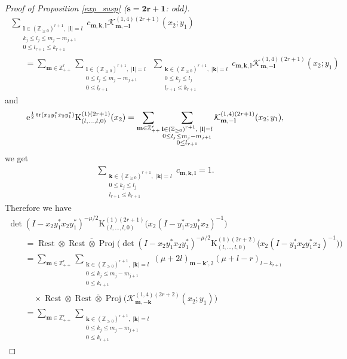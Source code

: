 \documentclass[pdftex]{sigma}
\numberwithin{equation}{section}
\newcommand{\bk}{\mathbf{k}}
\newcommand{\bl}{\mathbf{l}}
\newcommand{\bm}{\mathbf{m}}
\newcommand{\BZ}{\mathbb{Z}}
\newcommand{\cK}{\mathcal{K}}
\newcommand{\rK}{\mathrm{K}}
\newcommand{\tr}{\operatorname{tr}}
\newcommand{\Proj}{\operatorname{Proj}}
\newcommand{\Rest}{\operatorname{Rest}}
\begin{document}
\begin{proof}[Proof of Proposition \ref{exp_susp} ($\boldsymbol{s=2r+1}$: odd)]
\begin{gather*}
\;\sum_{\substack{\bl\in(\BZ_{\ge 0})^{r+1},\; |\bl|=l\\ k_j\le l_j\le m_j-m_{j+1}\\ 0\le l_{r+1}\le k_{r+1}}}
c_{\bm,\bk,\bl}\cK_{\bm,-\bl}^{(1,4)(2r+1)}(x_2;y_1) \\
\qquad{} =\sum_{\bm\in\BZ_{++}^r}\sum_{\substack{\bl\in(\BZ_{\ge 0})^{r+1},\; |\bl|=l\\ 0\le l_j\le m_j-m_{j+1}\\ 0\le l_{r+1}}}
\;\sum_{\substack{\bk\in(\BZ_{\ge 0})^{r+1},\; |\bk|=l\\ 0\le k_j\le l_j\\ l_{r+1}\le k_{r+1}}}
c_{\bm,\bk,\bl}\cK_{\bm,-\bl}^{(1,4)(2r+1)}(x_2;y_1)
\end{gather*}
and
\begin{gather*} {\rm e}^{\frac{1}{2}\tr(x_2y_1^*x_2y_1^*)}\rK_{(l,\ldots,l,0)}^{(1)(2r+1)}(x_2)
=\sum_{\bm\in\BZ_{++}^r}\sum_{\substack{\bl\in(\BZ_{\ge 0})^{r+1},\; |\bl|=l\\ 0\le l_j\le m_j-m_{j+1}\\ 0\le l_{r+1}}}
\cK_{\bm,-\bl}^{(1,4)(2r+1)}(x_2;y_1), \end{gather*}
we get
\begin{gather*} \sum_{\substack{\bk\in(\BZ_{\ge 0})^{r+1},\; |\bk|=l\\ 0\le k_j\le l_j\\ l_{r+1}\le k_{r+1}}}c_{\bm,\bk,\bl}=1. \end{gather*}
Therefore we have
\begin{gather*}
 \det(I-x_2y_1^*x_2y_1^*)^{-\mu/2}\rK_{(l,\ldots,l,0)}^{(1)(2r+1)}\big(x_2(I-y_1^*x_2y_1^*x_2)^{-1}\big) \\
 \qquad{} =\Rest\otimes\overline{\Rest\otimes\Proj}\big(
\det(I-x_2y_1^*x_2y_1^*)^{-\mu/2}\rK_{(l,\ldots,l,0)}^{(1)(2r+2)}\big(x_2(I-y_1^*x_2y_1^*x_2)^{-1}\big)\big) \\
\qquad{} =\sum_{\bm\in\BZ_{++}^r}\sum_{\substack{\bk\in(\BZ_{\ge 0})^{r+1},\; |\bk|=l\\ 0\le k_j\le m_j-m_{j+1}\\ 0\le k_{r+1}}}
(\mu+2l)_{\bm-\bk',2}(\mu+l-r)_{l-k_{r+1}}\\
\qquad\quad{} \times\Rest\otimes\overline{\Rest\otimes\Proj}\big(\cK_{\bm,-\bk}^{(1,4)(2r+2)}(x_2;y_1)\big) \\
\qquad{} =\sum_{\bm\in\BZ_{++}^r}\sum_{\substack{\bk\in(\BZ_{\ge 0})^{r+1},\; |\bk|=l\\ 0\le k_j\le m_j-m_{j+1}\\ 0\le k_{r+1}}}

\end{gather*}
\end{proof}
\end{document}
